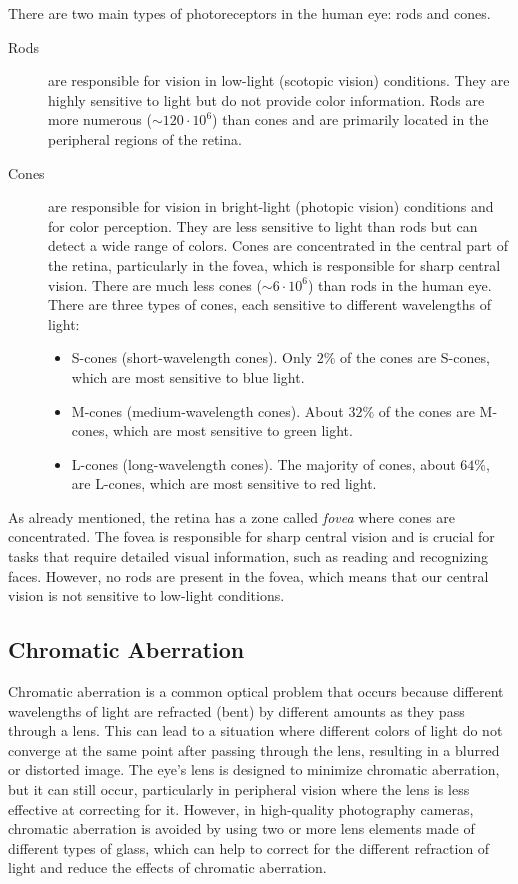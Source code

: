 There are two main types of photoreceptors in the human eye: rods and cones.
\begin{description}
    \item[Rods] are responsible for vision in low-light (scotopic vision) conditions. They are highly sensitive to light but do not provide color information. Rods are more numerous ($\sim 120\cdot 10^6$) than cones and are primarily located in the peripheral regions of the retina.
    \item[Cones] are responsible for vision in bright-light (photopic vision) conditions and for color perception. They are less sensitive to light than rods but can detect a wide range of colors. Cones are concentrated in the central part of the retina, particularly in the fovea, which is responsible for sharp central vision. There are much less cones ($\sim 6\cdot 10^6$) than rods in the human eye. There are three types of cones, each sensitive to different wavelengths of light:
    \begin{itemize}
        \item S-cones (short-wavelength cones). Only $2\%$ of the cones are S-cones, which are most sensitive to blue light.
        \item M-cones (medium-wavelength cones). About $32\%$ of the cones are M-cones, which are most sensitive to green light.
        \item L-cones (long-wavelength cones). The majority of cones, about $64\%$, are L-cones, which are most sensitive to red light.
    \end{itemize}
\end{description}

As already mentioned, the retina has a zone called \emph{fovea} where cones are concentrated. The fovea is responsible for sharp central vision and is crucial for tasks that require detailed visual information, such as reading and recognizing faces. However, no rods are present in the fovea, which means that our central vision is not sensitive to low-light conditions.

\subsection{Chromatic Aberration}

Chromatic aberration is a common optical problem that occurs because different wavelengths of light are refracted (bent) by different amounts as they pass through a lens. This can lead to a situation where different colors of light do not converge at the same point after passing through the lens, resulting in a blurred or distorted image.  The eye's lens is designed to minimize chromatic aberration, but it can still occur, particularly in peripheral vision where the lens is less effective at correcting for it. However, in high-quality photography cameras, chromatic aberration is avoided by using two or more lens elements made of different types of glass, which can help to correct for the different refraction of light and reduce the effects of chromatic aberration.

